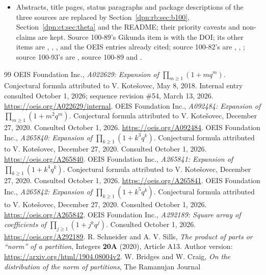 \documentclass[11pt]{article}
\numberwithin{equation}{section}
\theoremstyle{definition}\newtheorem{definition}[theorem]{Definition}
\theoremstyle{remark}\newtheorem{remark}[theorem]{Remark}
\begin{document}
\begin{itemize}
      report is stated in Section~\ref{dpn:ct:sec:transfer}; a reciprocal note
      there is proposed separately.
\item Abstracts, title pages, status paragraphs and package descriptions of
      the three sources are replaced by Section~\ref{dpn:rb:sec:b100},
      Section~\ref{dpn:ct:sec:theta} and the README; their priority caveats and
      non-claims are kept.  Source 100-89's Gikunda item is \cite{gikunda} with
      the DOI; its other items are \cite{GS}, \cite{BBBF}, \cite{AGW},
      \cite{Canton} and the OEIS entries already cited; source 100-82's are
      \cite{oeis1}, \cite{NR}, \cite{GS}; source 100-93's are \cite{oeisarray},
      source 100-89 and \cite{proveit93}.
\end{itemize}

\clearpage
{\small\raggedright
\begin{thebibliography}{99}
 OEIS Foundation Inc., \emph{A022629: Expansion of
$\prod_{m\ge1}(1+mq^m)$}. Conjectural formula attributed to V. Kote\v{s}ovec,
May 8, 2018. Internal entry consulted October 1, 2026; sequence revision
\#54, March 13, 2026. \url{https://oeis.org/A022629/internal}.
 OEIS Foundation Inc., \emph{A092484: Expansion of
$\prod_{m\ge1}(1+m^2q^m)$}. Conjectural formula attributed to V. Kote\v{s}ovec,
December 27, 2020. Consulted October 1, 2026.
\url{https://oeis.org/A092484}.
 OEIS Foundation Inc., \emph{A265840: Expansion of
$\prod_{k\ge1}(1+k^3q^k)$}. Conjectural formula attributed to V. Kote\v{s}ovec,
December 27, 2020. Consulted October 1, 2026.
\url{https://oeis.org/A265840}.
 OEIS Foundation Inc., \emph{A265841: Expansion of
$\prod_{k\ge1}(1+k^4q^k)$}. Conjectural formula attributed to V. Kote\v{s}ovec,
December 27, 2020. Consulted October 1, 2026.
\url{https://oeis.org/A265841}.
 OEIS Foundation Inc., \emph{A265842: Expansion of
$\prod_{k\ge1}(1+k^5q^k)$}. Conjectural formula attributed to V. Kote\v{s}ovec,
December 27, 2020. Consulted October 1, 2026.
\url{https://oeis.org/A265842}.
 OEIS Foundation Inc., \emph{A292189: Square array of
coefficients of $\prod_{j\ge1}(1+j^kq^j)$}. Consulted October 1, 2026.
\url{https://oeis.org/A292189}.
 R. Schneider and A. V. Sills,
\emph{The product of parts or ``norm'' of a partition}, Integers
\textbf{20A} (2020), Article A13. Author version:
\url{https://arxiv.org/html/1904.08004v2}.
 W. Bridges and W. Craig,
\emph{On the distribution of the norm of partitions}, The Ramanujan Journal

\end{thebibliography}}
\end{document}
